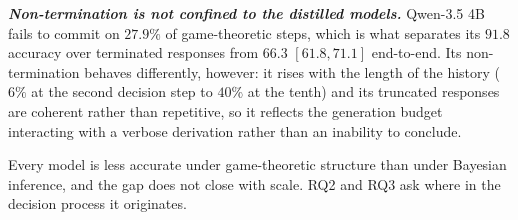 \textbf{\textit{Non-termination is not confined to the distilled models.}}
Qwen-3.5 4B fails to commit on $27.9\%$ of game-theoretic steps, which is what
separates its $91.8$ accuracy over terminated responses from $66.3$
$[61.8,71.1]$ end-to-end. Its non-termination behaves differently, however:
it rises with the length of the history ($6\%$ at the second decision step to
$40\%$ at the tenth) and its truncated responses are coherent rather than
repetitive, so it reflects the generation budget interacting with a verbose
derivation rather than an inability to conclude.

Every model is less accurate under game-theoretic structure than under Bayesian
inference, and the gap does not close with scale. RQ2 and RQ3 ask where in the
decision process it originates.
